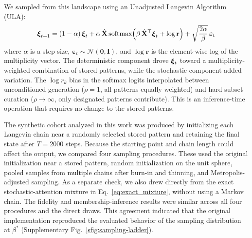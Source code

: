We sampled from this landscape using an Unadjusted Langevin Algorithm (ULA):
\begin{equation}
    \boldsymbol{\xi}_{t+1} = (1-\alpha)\,\boldsymbol{\xi}_t
    + \alpha\,\hat{\mathbf{X}}\,\text{softmax}\!\left(\beta\,\hat{\mathbf{X}}^\top\boldsymbol{\xi}_t + \log\mathbf{r}\right)
    + \sqrt{\frac{2\alpha}{\beta}}\,\boldsymbol{\varepsilon}_t
    \label{eq:ula}
\end{equation}
where $\alpha$ is a step size, $\boldsymbol{\varepsilon}_t\sim\mathcal{N}(\mathbf{0},\mathbf{I})$,
and $\log\mathbf{r}$ is the element-wise log of the multiplicity vector. The
deterministic component drove $\boldsymbol{\xi}_t$ toward a multiplicity-weighted combination of
stored patterns, while the stochastic component added variation. The
$\log r_k$ bias in the softmax logits interpolated between unconditioned generation ($\rho = 1$,
all patterns equally weighted) and hard subset curation ($\rho \to \infty$, only
designated patterns contribute). This is an inference-time operation that requires
no change to the stored patterns.

The synthetic cohort analyzed in this work was produced by initializing each Langevin
chain near a randomly selected stored pattern and retaining the final state after $T{=}2000$
steps. Because the starting point and chain length could affect the output, we compared four
sampling procedures. These used the original initialization near a stored pattern, random
initialization on the unit sphere, pooled samples from multiple chains after burn-in and
thinning, and Metropolis-adjusted sampling. As a separate check, we also drew directly from
the exact stochastic-attention mixture in Eq.~\eqref{eq:exact_mixture}, without using a Markov
chain. The fidelity and
membership-inference results were similar across all four procedures and the direct draws.
This agreement indicated that the original implementation reproduced the evaluated behavior
of the sampling distribution at $\beta^*$ (Supplementary
Fig.~\ref{sfig:sampling-ladder}).

